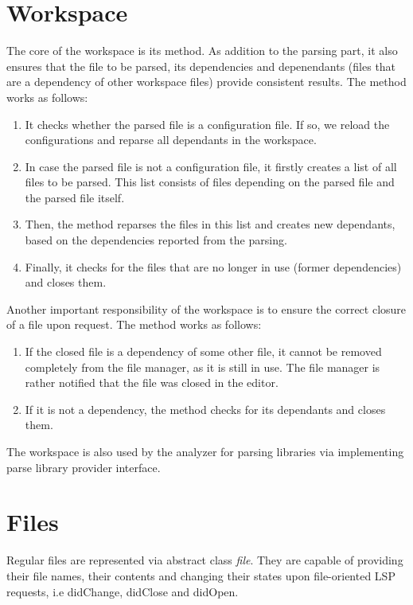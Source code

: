 \section{Workspace}

The core of the workspace is its  method. As addition to the parsing part, it also ensures that the file to be parsed, its dependencies and depenendants (files that are a dependency of other workspace files) provide consistent results. The method works as follows:

\begin{enumerate}
	\item It checks whether the parsed file is a configuration file. If so, we reload the configurations and reparse all dependants in the workspace.
	\item In case the parsed file is not a configuration file, it firstly creates a list of all files to be parsed. This list consists of files depending on the parsed file and the parsed file itself.
	\item Then, the method reparses the files in this list and creates new dependants, based on the dependencies reported from the parsing.
	\item Finally, it checks for the files that are no longer in use (former dependencies) and closes them.
\end{enumerate}

Another important responsibility of the workspace is to ensure the correct closure of a file upon  request. The method works as follows:

\begin{enumerate}
	\item If the closed file is a dependency of some other file, it cannot be removed completely from the file manager, as it is still in use. The file manager is rather notified that the file was closed in the editor.
	\item If it is not a dependency, the method checks for its dependants and closes them. 
\end{enumerate}                        

The workspace is also used by the analyzer for parsing libraries via implementing parse library provider interface. 

\section{Files}

Regular files are represented via abstract class \emph{file}. They are capable of providing their file names, their contents and changing their states upon file-oriented LSP requests, i.e didChange, didClose and didOpen.

